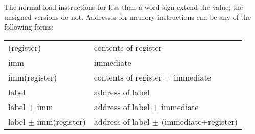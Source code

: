 \documentclass{article}
\begin{document}
The normal load instructions for less than a word sign-extend the
value; the unsigned versions do not.
Addresses for memory instructions can be any of the following forms:
\nopagebreak
\begin{center}
\begin{tabular}{ll}
(register) & contents of register \\
imm & immediate \\
imm(register) & contents of register + immediate \\
label & address of label \\
label $\pm$ imm & address of label $\pm$ immediate \\
label $\pm$ imm(register) & address of label $\pm$ (immediate+register)
\end{tabular}
\end{center}


\end{document}
